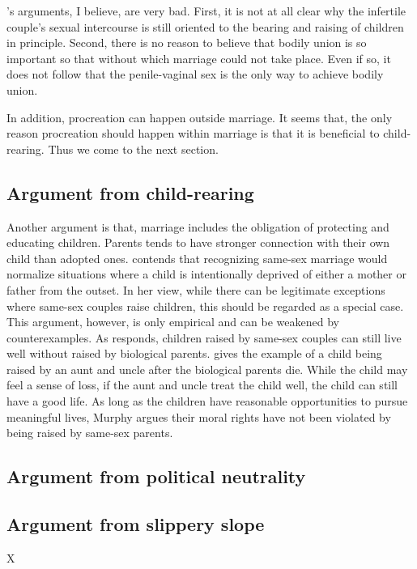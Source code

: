 \documentclass{article}
\begin{document}
's arguments, I believe, are very bad. First, it is not at all clear why the infertile couple's sexual intercourse is still oriented to the bearing and raising of children in principle. Second, there is no reason to believe that bodily union is so important so that without which marriage could not take place. Even if so, it does not follow that the penile-vaginal sex is the only way to achieve bodily union.

In addition, procreation can happen outside marriage. It seems that, the only reason procreation should happen within marriage is that it is beneficial to child-rearing. Thus we come to the next section. 

\subsection{Argument from child-rearing}

Another argument is that, marriage includes the obligation of protecting and educating children. Parents tends to have stronger connection with their own child than adopted ones. \textcite{somervilleCaseSameSexMarriage2012} contends that recognizing same-sex marriage would normalize situations where a child is intentionally deprived of either a mother or father from the outset. In her view, while there can be legitimate exceptions where same-sex couples raise children, this should be regarded as a special case. This argument, however, is only empirical and can be weakened by counterexamples. As \textcite{murphySameSexMarriageNot2011} responds, children raised by same-sex couples can still live well without raised by biological parents.  gives the example of a child being raised by an aunt and uncle after the biological parents die. While the child may feel a sense of loss, if the aunt and uncle treat the child well, the child can still have a good life. As long as the children have reasonable opportunities to pursue meaningful lives, Murphy argues their moral rights have not been violated by being raised by same-sex parents.


\subsection{Argument from political neutrality}

\subsection{Argument from slippery slope}


\printbibliography{}X
\end{document}

